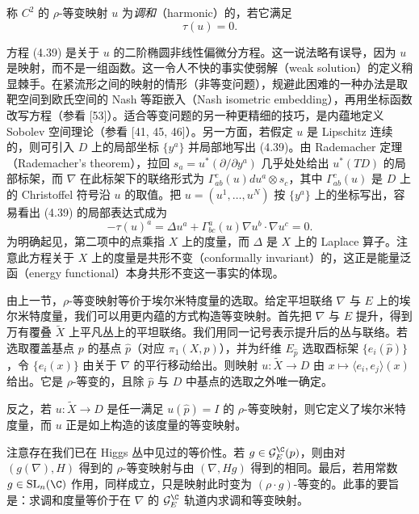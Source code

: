 \begin{definition}
称 $C^2$ 的 $\rho$-等变映射 $u$ 为\emph{调和}（harmonic）的，若它满足
\begin{equation}
\tau(u)=0.
\label{eq:4.39}\tag{4.39}
\end{equation}
\end{definition}

方程 (4.39) 是关于 $u$ 的二阶椭圆非线性偏微分方程。这一说法略有误导，因为 $u$ 是映射，而不是一组函数。这一令人不快的事实使弱解（weak solution）的定义稍显棘手。在紧流形之间的映射的情形（非等变问题），规避此困难的一种办法是取靶空间到欧氏空间的 Nash 等距嵌入（Nash isometric embedding），再用坐标函数改写方程（参看 [53]）。适合等变问题的另一种更精细的技巧，是内蕴地定义 Sobolev 空间理论（参看 [41, 45, 46]）。另一方面，若假定 $u$ 是 Lipschitz 连续的，则可引入 $D$ 上的局部坐标 $\{y^a\}$ 并局部地写出 (4.39)。由 Rademacher 定理（Rademacher's theorem），拉回 $s_a=u^*(\partial/\partial y^a)$ 几乎处处给出 $u^*(TD)$ 的局部标架，而 $\nabla$ 在此标架下的联络形式为 $\Gamma^c_{ab}(u)du^a\otimes s_c$，其中 $\Gamma^c_{ab}(u)$ 是 $D$ 上的 Christoffel 符号沿 $u$ 的取值。把 $u=(u^1,\dots,u^N)$ 按 $\{y^a\}$ 上的坐标写出，容易看出 (4.39) 的局部表达式成为
\begin{equation}
-\tau(u)^a=\Delta u^a+\Gamma^a_{bc}(u)\nabla u^b\cdot\nabla u^c=0.
\label{eq:4.40}\tag{4.40}
\end{equation}
为明确起见，第二项中的点乘指 $X$ 上的度量，而 $\Delta$ 是 $X$ 上的 Laplace 算子。注意此方程关于 $X$ 上的度量是共形不变（conformally invariant）的，这正是能量泛函（energy functional）本身共形不变这一事实的体现。

由上一节，$\rho$-等变映射等价于埃尔米特度量的选取。给定平坦联络 $\nabla$ 与 $E$ 上的埃尔米特度量，我们可以用更内蕴的方式构造等变映射。首先把 $\nabla$ 与 $E$ 提升，得到万有覆叠 $\widetilde X$ 上平凡丛上的平坦联络。我们用同一记号表示提升后的丛与联络。若选取覆盖基点 $p$ 的基点 $\hat p$（对应 $\pi_1(X,p)$），并为纤维 $E_{\hat p}$ 选取酉标架 $\{e_i(\hat p)\}$，令 $\{e_i(x)\}$ 由关于 $\nabla$ 的平行移动给出。则映射 $u\colon\widetilde X\to D$ 由 $x\mapsto\langle e_i,e_j\rangle(x)$ 给出。它是 $\rho$-等变的，且除 $\hat p$ 与 $D$ 中基点的选取之外唯一确定。

反之，若 $u\colon\widetilde X\to D$ 是任一满足 $u(\hat p)=I$ 的 $\rho$-等变映射，则它定义了埃尔米特度量，而 $u$ 正是如上构造的该度量的等变映射。

注意存在我们已在 Higgs 丛中见过的等价性。若 $g\in \mathcal{G}^{\C}_E(p)$，则由对 $(g(\nabla),H)$ 得到的 $\rho$-等变映射与由 $(\nabla,Hg)$ 得到的相同。最后，若用常数 $g\in\operatorname{SL}_n(\C)$ 作用，同样成立，只是映射此时变为 $(\rho\cdot g)$-等变的。此事的要旨是：求调和度量等价于在 $\nabla$ 的 $\mathcal{G}^{\C}_E$ 轨道内求调和等变映射。


